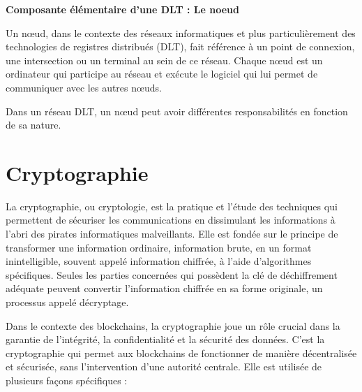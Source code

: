 \begin{tcolorbox}
\textbf{Composante élémentaire d'une DLT :  Le noeud}

Un nœud, dans le contexte des réseaux informatiques et plus particulièrement des technologies de registres distribués (DLT), fait référence à un point de connexion, une intersection ou un terminal au sein de ce réseau.
Chaque nœud est un ordinateur qui participe au réseau et exécute le logiciel qui lui permet de communiquer avec les autres nœuds.

Dans un réseau DLT, un nœud peut avoir différentes responsabilités en fonction de sa nature.

\end{tcolorbox}

\section{Cryptographie} \label{ansec:cryptographie}


La cryptographie, ou cryptologie, est la pratique et l'étude des techniques qui permettent de sécuriser les communications en dissimulant les informations à l'abri des pirates informatiques malveillants. Elle est fondée sur le principe de transformer une information ordinaire, information brute, en un format inintelligible, souvent appelé information chiffrée, à l'aide d'algorithmes spécifiques. Seules les parties concernées qui possèdent la clé de déchiffrement adéquate peuvent convertir l'information chiffrée en sa forme originale, un processus appelé décryptage.

Dans le contexte des blockchains, la cryptographie joue un rôle crucial dans la garantie de l'intégrité, la confidentialité et la sécurité des données. C'est la cryptographie qui permet aux blockchains de fonctionner de manière décentralisée et sécurisée, sans l'intervention d'une autorité centrale. Elle est utilisée de plusieurs façons spécifiques :


